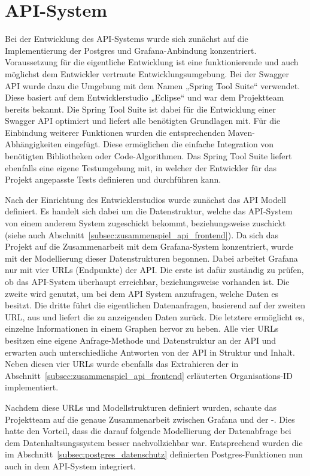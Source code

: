 \section{API-System}
\label{sec:api_system}
Bei der Entwicklung des \gls{API}\hyp{}Systems wurde sich zunächst auf die
Implementierung der Postgres und Grafana\hyp{}Anbindung konzentriert.
Voraussetzung für die eigentliche Entwicklung ist eine funktionierende und auch
möglichst dem Entwickler vertraute Entwicklungsumgebung. Bei der Swagger
\gls{API} wurde dazu die Umgebung mit dem Namen „Spring Tool Suite“ verwendet.
Diese basiert auf dem Entwicklerstudio „Eclipse“ und war dem Projektteam
bereits bekannt. Die Spring Tool Suite ist dabei für die Entwicklung einer
Swagger \gls{API} optimiert und liefert alle benötigten Grundlagen mit. Für die
Einbindung weiterer Funktionen wurden die entsprechenden
Maven\hyp{}Abhängigkeiten eingefügt. Diese ermöglichen die einfache Integration
von benötigten Bibliotheken oder Code\hyp{}Algorithmen. Das Spring Tool Suite
liefert ebenfalls eine eigene Testumgebung mit, in welcher der Entwickler für
das Projekt angepasste Tests definieren und durchführen kann.

Nach der Einrichtung des Entwicklerstudios wurde zunächst das \gls{API} Modell
definiert. Es handelt sich dabei um die Datenstruktur, welche das
\gls{API}\hyp{}System von einem anderem System zugeschickt bekommt,
beziehungsweise zuschickt (siehe auch
Abschnitt~\ref{subsec:zusammenspiel_api_frontend}). Da sich das Projekt auf die
Zusammenarbeit mit dem Grafana\hyp{}System konzentriert, wurde mit der
Modellierung dieser Datenstrukturen begonnen. Dabei arbeitet Grafana nur mit
vier URLs (Endpunkte) der \gls{API}\@. Die erste ist dafür zuständig zu prüfen,
ob das \gls{API}\hyp{}System überhaupt erreichbar, beziehungsweise vorhanden
ist. Die zweite wird genutzt, um bei dem \gls{API} System anzufragen, welche
Daten es besitzt. Die dritte führt die eigentlichen Datenanfragen, basierend
auf der zweiten URL, aus und liefert die zu anzeigenden Daten zurück. Die
letztere ermöglicht es, einzelne Informationen in einem Graphen hervor zu
heben. Alle vier URLs besitzen eine eigene Anfrage\hyp{}Methode und
Datenstruktur an der \gls{API} und erwarten auch unterschiedliche Antworten von
der \gls{API} in Struktur und Inhalt. Neben diesen vier URLs wurde ebenfalls
das Extrahieren der in Abschnitt~\ref{subsec:zusammenspiel_api_frontend}
erläuterten Organisations\hyp{}ID implementiert.

Nachdem diese URLs und Modellstrukturen definiert wurden, schaute das
Projektteam auf die genaue Zusammenarbeit zwischen Grafana und der \hyp{}\@.
Dies hatte den Vorteil, dass die darauf folgende Modellierung der Datenabfrage
bei dem Datenhaltsungssystem besser nachvollziehbar war. Entsprechend wurden
die im Abschnitt~\ref{subsec:postgres_datenschutz} definierten
Postgres\hyp{}Funktionen nun auch in dem \gls{API}\hyp{}System integriert.


